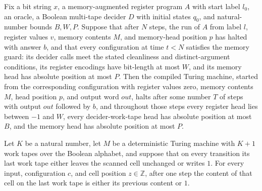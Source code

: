 \begin{theorem}
\label{Complexity.LogProg.marm_run}
\leanok
{}
Fix a bit string $x$, a memory-augmented register program $A$ with start label $l_0$, an
oracle, a Boolean multi-tape decider $D$ with initial states $q_0$, and natural-number
bounds $B,W,P$. Suppose that after $N$ steps, the run of $A$ from label $l$, register
values $v$, memory contents $M$, and memory-head position $p$ has halted with answer
$b$, and that every configuration at time $t<N$ satisfies the memory guard: its decider
calls meet the stated cleanliness and distinct-argument conditions, its register
encodings have bit-length at most $W$, and its memory head has absolute position at most
$P$. Then the compiled Turing machine, started from the corresponding configuration with
register values zero, memory contents $M$, head position $p$, and output word $out$,
halts after some number $T$ of steps with output $out$ followed by $b$, and throughout
those steps every register head lies between $-1$ and $W$, every decider-work-tape head
has absolute position at most $B$, and the memory head has absolute position at most
$P$.
\end{theorem}

\begin{lemma}
\label{Complexity.LogProg.step_last_cell}
\leanok
{}
Let $K$ be a natural number, let $M$ be a deterministic Turing machine with $K+1$ work
tapes over the Boolean alphabet, and suppose that on every transition its last work tape
either leaves the scanned cell unchanged or writes $1$. For every input, configuration
$c$, and cell position $z\in\mathbb Z$, after one step the content of that cell on the
last work tape is either its previous content or $1$.
\end{lemma}

